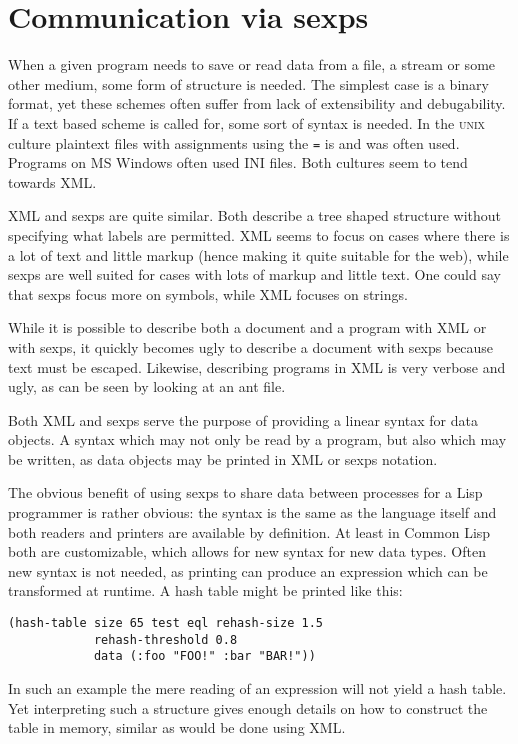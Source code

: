 \documentclass[a4paper,10pt,twoside]{report}
\newcommand{\cl}{Common Lisp}
\newcommand{\unix}{\textsc{unix}}
\newcommand{\windows}{MS Windows\texttrademark}
\begin{document}
\section{Communication via sexps}
\label{subsec:sexp-communication}

When a given program needs to save or read data from a file, a stream or some
other medium, some form of structure is needed.  The simplest case is a binary
format, yet these schemes often suffer from lack of extensibility and
debugability.  If a text based scheme is called for, some sort of syntax is
needed.  In the \unix{} culture plaintext files with assignments using the
\texttt{=} is and was often used.  Programs on \windows{} often used INI files.
Both cultures seem to tend towards XML.  

XML and sexps are quite similar.  Both describe a tree shaped structure without
specifying what labels are permitted.  XML seems to focus on cases where there
is a lot of text and little markup (hence making it quite suitable for the web),
while sexps are well suited for cases with lots of markup and little text.  One
could say that sexps focus more on symbols, while XML focuses on strings.

While it is possible to describe both a document and a program with XML or with
sexps, it quickly becomes ugly to describe a document with sexps because text
must be escaped.  Likewise, describing programs in XML is very verbose and ugly,
as can be seen by looking at an ant file.

Both XML and sexps serve the purpose of providing a linear syntax for data
objects.  A syntax which may not only be read by a program, but also which may
be written, as data objects may be printed in XML or sexps notation.

The obvious benefit of using sexps to share data between processes for a Lisp
programmer is rather obvious: the syntax is the same as the language itself and
both readers and printers are available by definition.  At least in \cl{} both
are customizable, which allows for new syntax for new data types.  Often new
syntax is not needed, as printing can produce an expression which can be
transformed at runtime.  A hash table might be printed like this:
\begin{lstlisting}[style=lispinline]
(hash-table size 65 test eql rehash-size 1.5
            rehash-threshold 0.8
            data (:foo "FOO!" :bar "BAR!"))
\end{lstlisting}

In such an example the mere reading of an expression will not yield a hash
table.  Yet interpreting such a structure gives enough details on how to
construct the table in memory, similar as would be done using XML.
\end{document}
